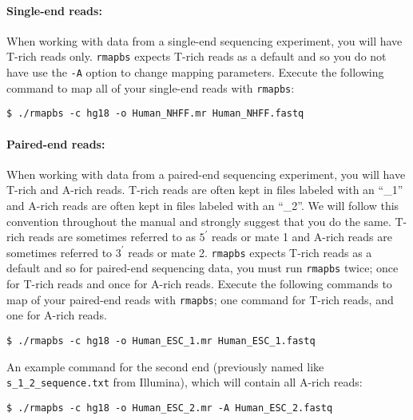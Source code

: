 \documentclass[10pt]{article}
\newcommand{\prog}[1]{\texttt{#1}}
\newcommand{\fn}[1]{\texttt{#1}}
\newcommand{\op}[1]{\texttt{#1}}
\begin{document}









\paragraph{Single-end reads:}
When working with data from a single-end sequencing experiment, you
will have T-rich reads only. \prog{rmapbs} expects T-rich reads as a
default and so you do not have use the \op{-A} option to change
mapping parameters. Execute the following command to map all of your
single-end reads with \prog{rmapbs}:
\begin{verbatim}
$ ./rmapbs -c hg18 -o Human_NHFF.mr Human_NHFF.fastq
\end{verbatim}

\paragraph{Paired-end reads:}
When working with data from a paired-end sequencing experiment, you
will have T-rich and A-rich reads. T-rich reads are often kept in
files labeled with an ``\_1'' and A-rich reads are often kept in files
labeled with an ``\_2''. We will follow this convention throughout the
manual and strongly suggest that you do the same. T-rich reads are
sometimes referred to as $5^{\prime}$ reads or mate 1 and A-rich
reads are sometimes referred to $3^{\prime}$ reads or mate 2.
 \prog{rmapbs} expects T-rich reads as a
default and so for paired-end sequencing data, you must run
\prog{rmapbs} twice; once for T-rich reads and once for A-rich
reads. Execute the following commands to map of your paired-end reads
with \prog{rmapbs}; one command for T-rich reads, and one for A-rich
reads.
\begin{verbatim}
$ ./rmapbs -c hg18 -o Human_ESC_1.mr Human_ESC_1.fastq
\end{verbatim}
An example command for the second end (previously named like
\fn{s\_1\_2\_sequence.txt} from Illumina), which will contain all
A-rich reads:
\begin{verbatim}
$ ./rmapbs -c hg18 -o Human_ESC_2.mr -A Human_ESC_2.fastq
\end{verbatim}
\end{document}
